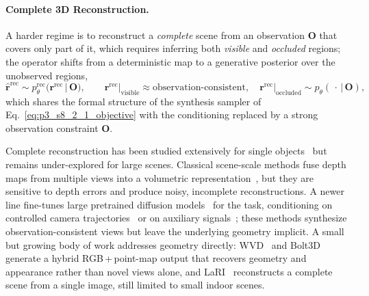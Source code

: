 \paragraph{Complete 3D Reconstruction.}
\label{para:p3_s8_2_3_complete}
A harder regime is to reconstruct a \emph{complete} scene from an observation $\mathbf{O}$ that covers only part of it, which requires inferring both \emph{visible} and \emph{occluded} regions; the operator shifts from a deterministic map to a generative posterior over the unobserved regions,
\begin{equation}
\hat{\mathbf{r}}^{\text{rec}}\sim p_\theta^{\text{rec}}\!\big(\mathbf{r}^{\text{rec}}\,\big|\,\mathbf{O}\big),
\qquad
\mathbf{r}^{\text{rec}}\big|_{\text{visible}}\approx \text{observation-consistent},
\quad
\mathbf{r}^{\text{rec}}\big|_{\text{occluded}}\sim p_\theta(\,\cdot\,\big|\,\mathbf{O}),
\label{eq:p3_s8_2_3_complete_objective}
\end{equation}
which shares the formal structure of the synthesis sampler of Eq.~\eqref{eq:p3_s8_2_1_objective} with the conditioning replaced by a strong observation constraint $\mathbf{O}$.

Complete reconstruction has been studied extensively for single objects~\cite{vahdat2022lion, zhang20233dshape2vecset, zhao2023michelangelo, zhang2024clay, ren2024xcube, xiang2025trellis, tochilkin2024triposr, yang2024hunyuan3d, hunyuan3d22025tencent, li2025triposg} but remains under-explored for large scenes.
Classical scene-scale methods fuse depth maps from multiple views into a volumetric representation~\cite{curless1996volumetric, newcombe2011kinectfusion, whelan2015elasticfusion, dai2017bundlefusion, niessner2013real}, but they are sensitive to depth errors and produce noisy, incomplete reconstructions.
A newer line fine-tunes large pretrained diffusion models~\cite{rombach2022ldm, blattmann2023stable} for the task, conditioning on controlled camera trajectories~\cite{wang2024motionctrl, sargent2024zeronvs, wu2024reconfusion, gao2024cat3d, wallingford2024image, zhou2025stable} or on auxiliary signals~\cite{liu2024reconx, yu2024viewcrafter, chen2024mvsplat360, yu2025wonderworld}; these methods synthesize observation-consistent views but leave the underlying geometry implicit.
A small but growing body of work addresses geometry directly: WVD~\cite{zhang2024world} and Bolt3D~\cite{szymanowicz2025bolt3d} generate a hybrid RGB\,+\,point-map output that recovers geometry and appearance rather than novel views alone, and LaRI~\cite{li2025lari} reconstructs a complete scene from a single image, still limited to small indoor scenes.

